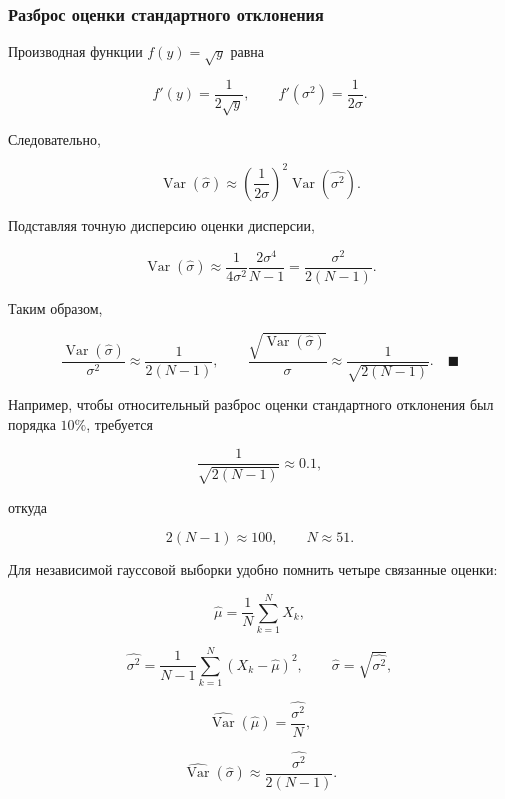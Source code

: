 \documentclass[
  russian,
  12pt,
  a4paper,
  a4paper,
  openany]{scrbook}
\begin{document}
\begin{bookderivation}

\subsubsection{Разброс оценки стандартного
отклонения}\label{ux440ux430ux437ux431ux440ux43eux441-ux43eux446ux435ux43dux43aux438-ux441ux442ux430ux43dux434ux430ux440ux442ux43dux43eux433ux43e-ux43eux442ux43aux43bux43eux43dux435ux43dux438ux44f-1}

Производная функции \(f(y)=\sqrt y\) равна

\[
f'(y)=\frac{1}{2\sqrt y},
\qquad
f'(\sigma^2)=\frac{1}{2\sigma}.
\]

Следовательно,

\[
\operatorname{Var}(\widehat\sigma)
\approx
\left(\frac{1}{2\sigma}\right)^2
\operatorname{Var}(\widehat{\sigma^2}).
\]

Подставляя точную дисперсию оценки дисперсии,

\[
\operatorname{Var}(\widehat\sigma)
\approx
\frac{1}{4\sigma^2}\frac{2\sigma^4}{N-1}
=
\frac{\sigma^2}{2(N-1)}.
\]

Таким образом,

\[
\boxed{
\frac{\operatorname{Var}(\widehat\sigma)}{\sigma^2}
\approx
\frac{1}{2(N-1)},
\qquad
\frac{\sqrt{\operatorname{Var}(\widehat\sigma)}}{\sigma}
\approx
\frac{1}{\sqrt{2(N-1)}}.
}
\quad\blacksquare
\]

\end{bookderivation}

Например, чтобы относительный разброс оценки стандартного отклонения был
порядка \(10\%\), требуется

\[
\frac{1}{\sqrt{2(N-1)}}\approx0.1,
\]

откуда

\[
2(N-1)\approx100,
\qquad
N\approx51.
\]

\begin{booknote}

Для независимой гауссовой выборки удобно помнить четыре связанные
оценки:

\[
\widehat\mu=\frac1N\sum_{k=1}^{N}X_k,
\]

\[
\widehat{\sigma^2}
=\frac1{N-1}\sum_{k=1}^{N}(X_k-\widehat\mu)^2,
\qquad
\widehat\sigma=\sqrt{\widehat{\sigma^2}},
\]

\[
\widehat{\operatorname{Var}}(\widehat\mu)
=\frac{\widehat{\sigma^2}}{N},
\]

\[
\widehat{\operatorname{Var}}(\widehat\sigma)
\approx
\frac{\widehat{\sigma^2}}{2(N-1)}.
\]

\end{booknote}
\end{document}
